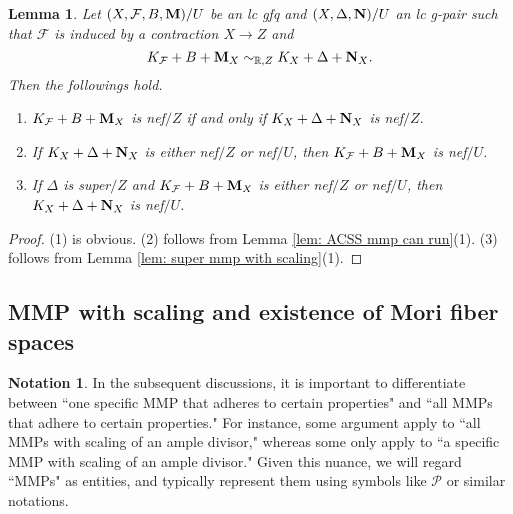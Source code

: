 \documentclass[11pt]{amsart}
\numberwithin{equation}{section}
\newcommand{\Mm}{{\bf{M}}}
\newcommand{\Nn}{{\bf{N}}}
\newcommand{\Rr}{\mathbb{R}}
\newcommand{\Ff}{\mathcal{F}}
\newtheorem{lem}[thm]{Lemma}
\theoremstyle{definition}
\theoremstyle{definition}
\newtheorem{nota}[thm]{Notation}
\theoremstyle{definition}
\begin{document}
\begin{lem}\label{lem: equivalence over bases}
Let $(X,\Ff,B,\Mm)/U$ be an lc gfq and $(X,\Delta,\Nn)/U$ an lc g-pair such that $\Ff$ is induced by a contraction $X\to Z$ and
$$K_\Ff+B+\Mm_X\sim_{\Rr,Z}K_X+\Delta+\Nn_X.$$
Then the followings hold.
\begin{enumerate}
    \item $K_{\Ff}+B+\Mm_X$ is nef$/Z$ if and only if $K_X+\Delta+\Nn_X$ is nef$/Z$.
    \item If $K_X+\Delta+\Nn_X$ is either nef$/Z$ or nef$/U$, then $K_{\Ff}+B+\Mm_X$ is nef$/U$.
    \item If $\Delta$ is super$/Z$ and $K_{\Ff}+B+\Mm_X$ is either nef$/Z$ or nef$/U$, then $K_X+\Delta+\Nn_X$ is nef$/U$.
\end{enumerate}
\end{lem}
\begin{proof}
(1) is obvious. (2) follows from Lemma \ref{lem: ACSS mmp can run}(1). (3) follows from Lemma \ref{lem: super mmp with scaling}(1).
\end{proof}

\subsection{MMP with scaling and existence of Mori fiber spaces}\label{subsec: eomfs}

\begin{nota}
In the subsequent discussions, it is important to differentiate between ``one specific MMP that adheres to certain properties" and ``all MMPs that adhere to certain properties." For instance, some argument apply to ``all MMPs with scaling of an ample divisor," whereas some only apply to ``a specific MMP with scaling of an ample divisor." Given this nuance, we will regard ``MMPs" as entities, and typically represent them using symbols like $\mathcal{P}$ or similar notations.
\end{nota}
\end{document}
